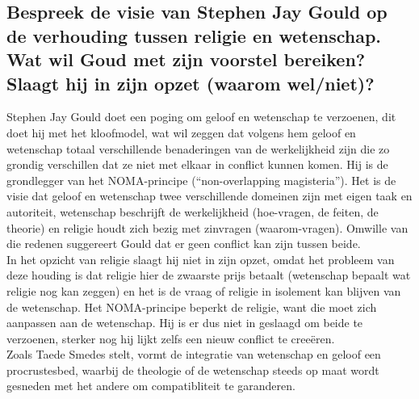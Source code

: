 \documentclass[11pt,a4paper,titlepage]{article}
\begin{document}
\subsection{Bespreek de visie van Stephen Jay Gould op de verhouding tussen religie en wetenschap.
Wat wil Goud met zijn voorstel bereiken? Slaagt hij in zijn opzet (waarom wel/niet)?}
Stephen Jay Gould doet een poging om geloof en wetenschap te verzoenen, dit doet hij met het kloofmodel, wat wil zeggen dat volgens hem geloof en wetenschap totaal verschillende benaderingen van de werkelijkheid zijn die zo grondig verschillen dat ze niet met elkaar in conflict kunnen komen. Hij is de grondlegger van het NOMA-principe (“non-overlapping magisteria”). Het is de visie dat geloof en wetenschap twee verschillende domeinen zijn met eigen taak en autoriteit, wetenschap beschrijft de werkelijkheid (hoe-vragen, de feiten, de theorie) en religie houdt zich bezig met zinvragen (waarom-vragen). Omwille van die redenen suggereert Gould dat er geen conflict kan zijn tussen beide. \\
In het opzicht van religie slaagt hij niet in zijn opzet, omdat het probleem van deze houding is dat religie hier de zwaarste prijs betaalt (wetenschap bepaalt wat religie nog kan zeggen) en het is de vraag of religie in isolement kan blijven van de wetenschap. Het NOMA-principe beperkt de religie, want die moet zich aanpassen aan de wetenschap. Hij is er dus niet in geslaagd om beide te verzoenen, sterker nog hij lijkt zelfs een nieuw conflict te creeëren. \\
Zoals Taede Smedes stelt, vormt de integratie van wetenschap en geloof een procrustesbed, waarbij de theologie of de wetenschap steeds op maat wordt gesneden met het andere om compatibliteit te garanderen.
\end{document}

